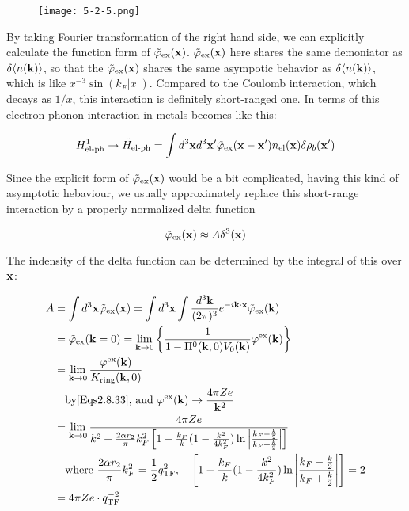 \begin{wrapfigure}{l}{4cm}
\texttt{[image: 5-2-5.png]}
\end{wrapfigure}
By taking Fourier transformation of the right hand side, we can explicitly calculate the function form of $\tilde\varphi_{\text{ex}}({\bf x})$. $\tilde\varphi_{\text{ex}}({\bf x})$ here shares the same demoniator as $\delta\langle n({\bf k})\rangle$, so that the $\tilde\varphi_{\text{ex}}({\bf x})$ shares the same asympotic behavior as $\delta\langle n({\bf k})\rangle$, which is like $x^{-3}\sin(k_F|x|)$. Compared to the Coulomb interaction, which decays as $1/x$, this interaction is definitely short-ranged one. In terms of this electron-phonon interaction in metals becomes like this:

\[H_{\text{el-ph}}^1\to\tilde H_{\text{el-ph}} = \int d^3{\bf x}d^3{\bf x'} \tilde\varphi_{\text{ex}}({\bf x - x'}) n_{\text{el}}({\bf x})\delta\rho_b({\bf x'})\]

Since the explicit form of $\tilde\varphi_{\text{ex}}({\bf x})$ would be a bit complicated, having this kind of asymptotic hebaviour, we usually approximately replace this short-range interaction by a properly normalized delta function

\[\tilde\varphi_{\text{ex}}({\bf x}) \approx A\delta^3({\bf x})\]

The indensity of the delta function can be determined by the integral of this over $\bf x$:

\[\begin{split}
A &=\int d^3{\bf x}\tilde\varphi_{\text{ex}}({\bf x}) = \int d^3{\bf x}\int \frac{d^3\bf k}{(2\pi)^3}e^{-i\bf k\cdot x}\tilde\varphi_{\text{ex}}({\bf k})\\
&=\tilde\varphi_{\text{ex}}({\bf k} = 0) = \lim_{{\bf k}\to0}\left\{\frac{1}{1 - \Pi^0({\bf k},0)V_0({\bf k})}\varphi^{\text{ex}}({\bf k}) \right\}\\
&=\lim_{{\bf k}\to0}\frac{\varphi^{\text{ex}}({\bf k})}{K_{\text{ring}}({\bf k},0)}\\
&\quad \text{by\eqref{Eqs2.8.33}, and }\varphi^{\text{ex}}({\bf k}) \to \frac{4\pi Ze}{{\bf k}^2}\\
&=\lim_{{\bf k}\to0}\frac{4\pi Ze}{k^2+\frac{2\alpha r_2}{\pi}k_F^2\left[1 - \frac{k_F}{k}(1-\frac{k^2}{4k_F^2})\ln\left|\frac{k_F - \frac{k}{2}}{k_F + \frac{k}{2}}\right|\right]}\\
&\quad \text{where }\frac{2\alpha r_2}{\pi}k_F^2 = \frac{1}{2}q_{\text{TF}}^{2},\quad \left[1 - \frac{k_F}{k}(1-\frac{k^2}{4k_F^2})\ln\left|\frac{k_F - \frac{k}{2}}{k_F + \frac{k}{2}}\right|\right] = 2\\
&=4\pi Ze\cdot q_{\text{TF}}^{-2}
\end{split} \]

